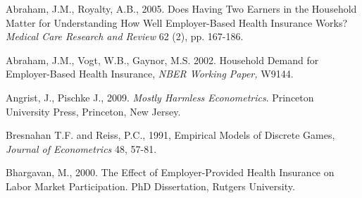 \documentclass[legno,11pt]{article}
\begin{document}
\begin{thebibliography}{12}

 Abraham, J.M., Royalty, A.B., 2005. Does Having Two Earners in the Household Matter for Understanding How
                Well Employer-Based Health Insurance Works? \emph{Medical Care Research and Review} 62 (2), pp. 167-186.

 Abraham, J.M., Vogt, W.B., Gaynor, M.S. 2002. Household Demand for Employer-Based Health Insurance, \emph{NBER Working Paper,} W9144.


 Angrist, J., Pischke J., 2009. \emph{Mostly Harmless Econometrics}. Princeton University Press, Princeton, New Jersey.


 Bresnahan T.F. and Reiss, P.C., 1991, Empirical Models of Discrete Games, \emph{Journal of Econometrics} 48, 57-81.









 Bhargavan, M., 2000.
               The Effect of Employer-Provided Health Insurance on Labor Market Participation.
               PhD Dissertation, Rutgers University.




\end{thebibliography}
\end{document}

